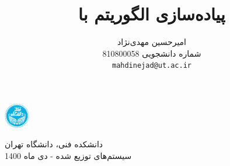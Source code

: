 \documentclass{article}
\title{
پیاده‌سازی الگوریتم
\lr{Paxos}
با
\lr{TLA+}}
\author{%
  امیرحسین مهدی‌نژاد\\
  شماره دانشجویی 810800058\\
  \texttt{mahdinejad@ut.ac.ir} \\
}
\begin{document}
\begin{minipage}{0.1\textwidth}%
\includegraphics[width=1.1cm]{Photos/UT_logo.png}
\end{minipage}%
\hfill%
\begin{minipage}{0.9\textwidth}\raggedleft
دانشکده فنی، دانشگاه تهران\\
سیستم‌های توزیع شده - 
دی
ماه 1400\\
\end{minipage}

\makepertitle

\end{document}
